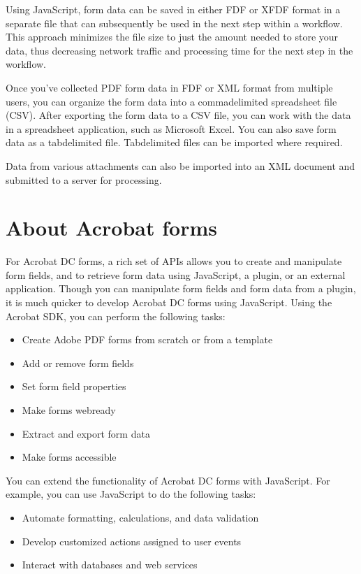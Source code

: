 \documentclass[letterpaper,12pt,english,openany,oneside]{sphinxmanual}
\begin{document}
Using JavaScript, form data can be saved in either FDF or XFDF format in a separate file that can subsequently be used in the next step within a workflow. This approach minimizes the file size to just the amount needed to store your data, thus decreasing network traffic and processing time for the next step in the workflow.

Once you’ve collected PDF form data in FDF or XML format from multiple users, you can organize the form data into a comma\sphinxhyphen{}delimited spreadsheet file (CSV). After exporting the form data to a CSV file, you can work with the data in a spreadsheet application, such as Microsoft Excel. You can also save form data as a tab\sphinxhyphen{}delimited file. Tab\sphinxhyphen{}delimited files can be imported where required.

Data from various attachments can also be imported into an XML document and submitted to a server for processing.




\section{About Acrobat forms}
\label{\detokenize{Overview_Forms:about-acrobat-forms}}
For Acrobat DC forms, a rich set of APIs allows you to create and manipulate form fields, and to retrieve form data using JavaScript, a plug\sphinxhyphen{}in, or an external application. Though you can manipulate form fields and form data from a plug\sphinxhyphen{}in, it is much quicker to develop Acrobat DC forms using JavaScript. Using the Acrobat SDK, you can perform the following tasks:
\begin{itemize}
\item {} 
Create Adobe PDF forms from scratch or from a template

\item {} 
Add or remove form fields

\item {} 
Set form field properties

\item {} 
Make forms web\sphinxhyphen{}ready

\item {} 
Extract and export form data

\item {} 
Make forms accessible

\end{itemize}

You can extend the functionality of Acrobat DC forms with JavaScript. For example, you can use JavaScript to do the following tasks:
\begin{itemize}
\item {} 
Automate formatting, calculations, and data validation

\item {} 
Develop customized actions assigned to user events

\item {} 
Interact with databases and web services

\end{itemize}
\end{document}
